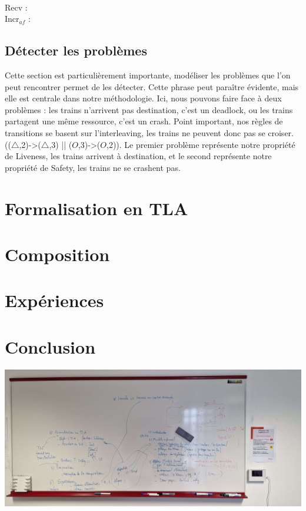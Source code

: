 \documentclass[runningheads]{llncs}
\begin{document}
\noindent
\\Recv : 
\\Incr$_{af}$ :



\subsection{Détecter les problèmes}
Cette section est particulièrement importante, modéliser les problèmes que l'on peut rencontrer permet de les détecter.
Cette phrase peut paraître évidente, mais elle est centrale dans notre méthodologie. Ici, nous pouvons faire face à deux problèmes : 
les trains n'arrivent pas destination, c'est un deadlock, ou les trains partagent une même ressource, c'est un crash. 
Point important, nos règles de transitions se basent sur l'interleaving, les trains ne peuvent donc pas se croiser. (($\triangle$,2)->($\triangle$,3) || ($O$,3)->($O$,2)).
Le premier problème représente notre propriété de Liveness, les trains arrivent à destination, et le second représente notre propriété de Safety, les trains ne se crashent pas.

\section{Formalisation en TLA}
\label{sec:tla-formalisation}

\section{Composition}
\label{sec:composition}

\section{Expériences}
\label{sec:experiments}

\newpage

\section{Conclusion}
\label{sec:conclusion}

\includegraphics[scale=0.1]{img/sommaire_tableau.jpg}




\end{document}
